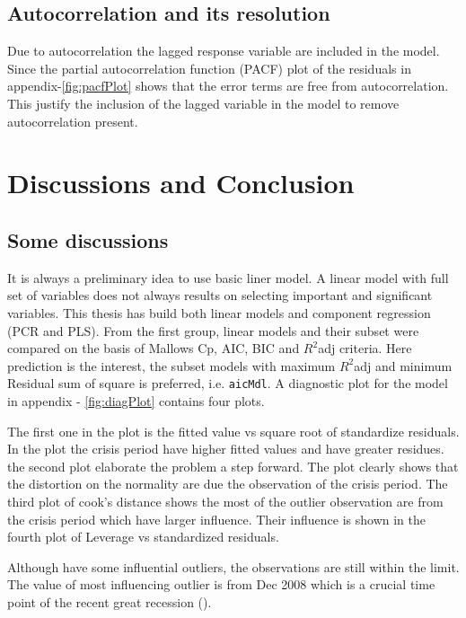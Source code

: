 \documentclass[12pt, lot, lof]{thesis}\usepackage[]{graphicx}\usepackage[]{color}
\begin{document}
\section{Autocorrelation and its resolution}
\label{sec:autocorr}
Due to autocorrelation the lagged response variable are included in the model. Since the partial autocorrelation function (PACF) plot of the residuals in appendix-\ref{fig:pacfPlot} shows that the error terms are free from autocorrelation. This justify the inclusion of the lagged variable in the model to remove autocorrelation present.
 


\chapter{Discussions and Conclusion}
\label{ch:DiscsConclusion}

\section{Some discussions}
\label{sec:discussions}
It is always a preliminary idea to use basic liner model. A linear model with full set of variables does not always results on selecting important and significant variables. This thesis has build both linear models and component regression (PCR and PLS). From the first group, linear models and their subset were compared on the basis of Mallows Cp, AIC, BIC and $R^2$adj criteria. Here prediction is the interest, the subset models with maximum $R^2$adj and minimum Residual sum of square is preferred, i.e. \texttt{aicMdl}. A diagnostic plot for the model in appendix - \ref{fig:diagPlot} contains four plots. 

The first one in the plot is the fitted value vs square root of standardize residuals. In the plot the crisis period have higher fitted values and have greater residues. the second plot elaborate the problem a step forward. The plot clearly shows that the distortion on the normality are due the observation of the crisis period. The third plot of cook's distance shows the most of the outlier observation are from the crisis period which have larger influence. Their influence is shown in the fourth plot of Leverage vs standardized residuals.

Although have some influential outliers, the observations are still within the limit. The value of most influencing outlier is from Dec 2008 which is a crucial time point of the recent great recession (\cite{FinCrisis2009Kred}).
\end{document}

